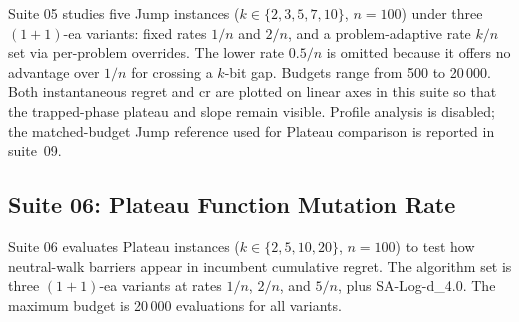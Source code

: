 %
Suite 05 studies five Jump instances ($k \in \{2,3,5,7,10\}$, $n=100$) under
three $(1+1)$-\acrshort{ea} variants: fixed rates $1/n$ and $2/n$, and a
problem-adaptive rate $k/n$ set via per-problem overrides. The lower rate
$0.5/n$ is omitted because it offers no advantage over $1/n$ for crossing a
$k$-bit gap. Budgets range from 500 to 20\,000. Both instantaneous regret and
\acrshort{cr} are plotted on linear axes in this suite so that the
trapped-phase plateau and slope remain visible. Profile analysis is
disabled; the
matched-budget Jump reference used for Plateau comparison is reported in
suite~09.

\subsection{Suite 06: Plateau Function Mutation Rate}




%
Suite 06 evaluates Plateau instances ($k \in \{2,5,10,20\}$, $n=100$) to test
how neutral-walk barriers appear in incumbent cumulative regret. The algorithm
set is three $(1+1)$-\acrshort{ea} variants at rates $1/n$, $2/n$, and $5/n$,
plus SA-Log-d\_4.0. The maximum budget is 20\,000 evaluations for all variants.

